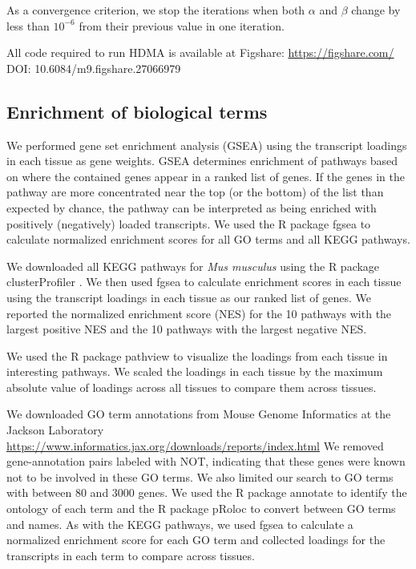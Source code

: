 \documentclass[
]{article}
\begin{document}
As a convergence criterion, we stop the iterations when both \(\alpha\)
and \(\beta\) change by less than \(10^{-6}\) from their previous value
in one iteration.

All code required to run HDMA is available at Figshare:
\url{https://figshare.com/} DOI: 10.6084/m9.figshare.27066979

\subsection{Enrichment of biological
terms}\label{enrichment-of-biological-terms}

We performed gene set enrichment analysis (GSEA) \cite{pmid16199517}
using the transcript loadings in each tissue as gene weights. GSEA
determines enrichment of pathways based on where the contained genes
appear in a ranked list of genes. If the genes in the pathway are more
concentrated near the top (or the bottom) of the list than expected by
chance, the pathway can be interpreted as being enriched with positively
(negatively) loaded transcripts. We used the R package fgsea
\cite{fgsea} to calculate normalized enrichment scores for all GO terms
and all KEGG pathways.

We downloaded all KEGG \cite{pmid36300620} pathways for
\textit{Mus musculus} using the R package clusterProfiler
\cite{pmid36300620}. We then used fgsea to calculate enrichment scores
in each tissue using the transcript loadings in each tissue as our
ranked list of genes. We reported the normalized enrichment score (NES)
for the 10 pathways with the largest positive NES and the 10 pathways
with the largest negative NES.

We used the R package pathview \cite{pmid23740750} to visualize the
loadings from each tissue in interesting pathways. We scaled the
loadings in each tissue by the maximum absolute value of loadings across
all tissues to compare them across tissues.

We downloaded GO term annotations from Mouse Genome Informatics at the
Jackson Laboratory \cite{pmid33231642}
\url{https://www.informatics.jax.org/downloads/reports/index.html} We
removed gene-annotation pairs labeled with NOT, indicating that these
genes were known not to be involved in these GO terms. We also limited
our search to GO terms with between 80 and 3000 genes. We used the R
package annotate \cite{R_annotate} to identify the ontology of each term
and the R package pRoloc \cite{pmid24413670} to convert between GO terms
and names. As with the KEGG pathways, we used fgsea to calculate a
normalized enrichment score for each GO term and collected loadings for
the transcripts in each term to compare across tissues.
\end{document}
